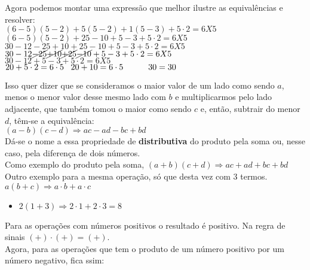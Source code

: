 Agora podemos montar uma expressão que melhor ilustre as equivalências e resolver: \\
$ (6-5)(5-2) + 5(5-2) + 1(5-3) + 5 \cdot 2 = 6X5 $ \\
$ (6-5)(5-2) + 25 - 10 + 5-3 + 5 \cdot 2 = 6X5 $ \\
$ 30 - 12 - 25 + 10 + 25 - 10 + 5-3 + 5 \cdot 2 = 6X5 $ \\
$ 30 - 12 \cancel{-25} \cancel{+10} \cancel{+25} \cancel{-10} + 5 - 3 + 5 \cdot 2 = 6X5 $ \\
$ 30 - 12 + 5 - 3 + 5 \cdot 2 = 6X5 $ \\
$ 20 + 5 \cdot 2 = 6 \cdot 5 \\
 \indent \! \! \! \! 20 + 10 = 6 \cdot 5 \\
 \indent \indent 30 = 30 $

\newpage

Isso quer dizer que se consideramos o maior valor de um lado como sendo $a$, menos o menor valor desse mesmo lado com $b$ e multiplicarmos pelo lado adjacente, que também tomou o maior como sendo $c$ e, então, subtrair do menor $d$, têm-se a equivalência: \\
 $ (a - b)(c - d) \Longrightarrow ac - ad - bc + bd$ \\

 Dá-se o nome a essa propriedade de \textbf{distributiva} do produto pela soma ou, nesse caso, pela diferença de dois números. \\
Como exemplo do produto pela soma, $ (a + b)(c + d) \Longrightarrow ac + ad + bc + bd$ \\

Outro exemplo para a mesma operação, só que desta vez com $3$ termos. \\
$ a(b+c) \Longrightarrow a \cdot b + a \cdot c $ 

\begin{itemize}
	\item $ 2(1 + 3) \Longrightarrow 2 \cdot 1 + 2 \cdot 3 = 8 $
\end{itemize}

Para as operações com números positivos o resultado é positivo. Na regra de sinais $ (+) \cdot (+) = (+) $. \\

Agora, para as operações que tem o produto de um número positivo por um número negativo, fica ssim:

